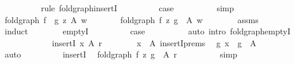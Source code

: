 \begin{isabellebody}
\ \ \ \ \ \ \ \ \isamarkupfalse%
\ {\isacharparenleft}{\kern0pt}rule\ fold{\isacharunderscore}{\kern0pt}graph{\isachardot}{\kern0pt}insertI{\isacharparenright}{\kern0pt}\isanewline
\ \ \ \ \ \ \isamarkupfalse%
\ \isamarkupfalse%
\ {\isacharquery}{\kern0pt}case\isanewline
\ \ \ \ \ \ \ \ \isamarkupfalse%
\ simp\isanewline
\ \ \ \ \isamarkupfalse%
\isanewline
\ \ \isamarkupfalse%
\isanewline
\ \ \ \ \isamarkupfalse%
\ {\isachardoublequoteopen}fold{\isacharunderscore}{\kern0pt}graph\ {\isacharparenleft}{\kern0pt}f\ {\isasymcirc}\ g{\isacharparenright}{\kern0pt}\ z\ A\ w{\isachardoublequoteclose}\isanewline
\ \ \ \ \isamarkupfalse%
\ \isamarkupfalse%
\ {\isachardoublequoteopen}fold{\isacharunderscore}{\kern0pt}graph\ f\ z\ {\isacharparenleft}{\kern0pt}g\ {\isacharbackquote}{\kern0pt}\ A{\isacharparenright}{\kern0pt}\ w{\isachardoublequoteclose}\isanewline
\ \ \ \ \ \ \isamarkupfalse%
\ assms\isanewline
\ \ \ \ \isamarkupfalse%
\ induct\isanewline
\ \ \ \ \ \ \isamarkupfalse%
\ emptyI\isanewline
\ \ \ \ \ \ \isamarkupfalse%
\ \isamarkupfalse%
\ {\isacharquery}{\kern0pt}case\isanewline
\ \ \ \ \ \ \ \ \isamarkupfalse%
\ {\isacharparenleft}{\kern0pt}auto\ intro{\isacharcolon}{\kern0pt}\ fold{\isacharunderscore}{\kern0pt}graph{\isachardot}{\kern0pt}emptyI{\isacharparenright}{\kern0pt}\isanewline
\ \ \ \ \isamarkupfalse%
\isanewline
\ \ \ \ \ \ \isamarkupfalse%
\ {\isacharparenleft}{\kern0pt}insertI\ x\ A\ r{\isacharparenright}{\kern0pt}\isanewline
\ \ \ \ \ \ \isamarkupfalse%
\ {\isacartoucheopen}x\ {\isasymnotin}\ A{\isacartoucheclose}\ insertI{\isachardot}{\kern0pt}prems\ \isamarkupfalse%
\ {\isachardoublequoteopen}g\ x\ {\isasymnotin}\ g\ {\isacharbackquote}{\kern0pt}\ A{\isachardoublequoteclose}\isanewline
\ \ \ \ \ \ \ \ \isamarkupfalse%
\ auto\isanewline
\ \ \ \ \ \ \isamarkupfalse%
\ \isamarkupfalse%
\ insertI\ \isamarkupfalse%
\ {\isachardoublequoteopen}fold{\isacharunderscore}{\kern0pt}graph\ f\ z\ {\isacharparenleft}{\kern0pt}g\ {\isacharbackquote}{\kern0pt}\ A{\isacharparenright}{\kern0pt}\ r{\isachardoublequoteclose}\isanewline
\ \ \ \ \ \ \ \ \isamarkupfalse%
\ simp\isanewline
\ \ \ \ \ \ \isamarkupfalse%
\ \isamarkupfalse%

\end{isabellebody}

